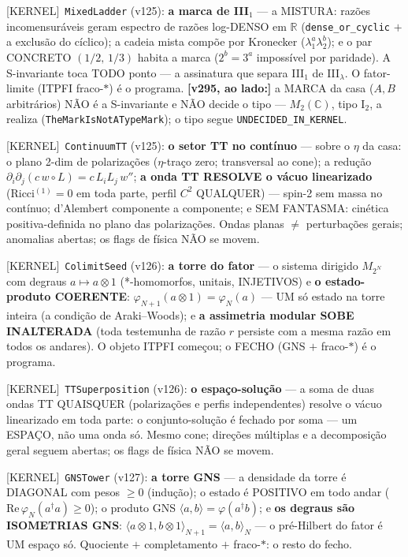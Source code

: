 \documentclass[11pt]{article}
\providecommand{\kernelmk}[1]{\textsf{[KERNEL]}~\texttt{#1}}\providecommand{\knownmk}[1]{\textsf{[KNOWN]}~{#1}}\providecommand{\statusmk}[1]{\textsf{[#1]}}
\theoremstyle{definition}\newtheorem{deriv}{Derivação}
\begin{document}
\kernelmk{MixedLadder} (v125): \textbf{a marca de III$_1$} --- a MISTURA: razões incomensuráveis geram espectro de razões log-DENSO em $\mathbb{R}$ (\texttt{dense\_or\_cyclic} $+$ a exclusão do cíclico); a cadeia mista compõe por Kronecker ($\lambda_1^a\lambda_2^b$); e o par CONCRETO $(1/2,\,1/3)$ habita a marca ($2^b=3^a$ impossível por paridade). A S-invariante toca TODO ponto — a assinatura que separa III$_1$ de III$_\lambda$. O fator-limite (ITPFI fraco-$*$) é o programa. \textbf{[v295, ao lado:]} a MARCA da casa ($A,B$ arbitrários) NÃO é a S-invariante e NÃO decide o tipo — $M_2(\mathbb{C})$, tipo I$_2$, a realiza (\texttt{TheMarkIsNotATypeMark}); o tipo segue \texttt{UNDECIDED\_IN\_KERNEL}.

\kernelmk{ContinuumTT} (v125): \textbf{o setor TT no contínuo} --- sobre o $\eta$ da casa: o plano 2-dim de polarizações ($\eta$-traço zero; transversal ao cone); a redução $\partial_i\partial_j(c\,w{\circ}L)=c\,L_iL_j\,w''$; \textbf{a onda TT RESOLVE o vácuo linearizado} (Ricci$^{(1)}=0$ em toda parte, perfil $C^2$ QUALQUER) --- spin-2 sem massa no contínuo; d'Alembert componente a componente; e SEM FANTASMA: cinética positiva-definida no plano das polarizações. Ondas planas $\neq$ perturbações gerais; anomalias abertas; os flags de física NÃO se movem.

\kernelmk{ColimitSeed} (v126): \textbf{a torre do fator} --- o sistema dirigido $M_{2^N}$ com degraus $a\mapsto a\otimes1$ (*-homomorfos, unitais, INJETIVOS) e \textbf{o estado-produto COERENTE}: $\varphi_{N+1}(a\otimes 1)=\varphi_N(a)$ --- UM só estado na torre inteira (a condição de Araki--Woods); e \textbf{a assimetria modular SOBE INALTERADA} (toda testemunha de razão $r$ persiste com a mesma razão em todos os andares). O objeto ITPFI começou; o FECHO (GNS $+$ fraco-$*$) é o programa.

\kernelmk{TTSuperposition} (v126): \textbf{o espaço-solução} --- a soma de duas ondas TT QUAISQUER (polarizações e perfis independentes) resolve o vácuo linearizado em toda parte: o conjunto-solução é fechado por soma --- um ESPAÇO, não uma onda só. Mesmo cone; direções múltiplas e a decomposição geral seguem abertas; os flags de física NÃO se movem.

\kernelmk{GNSTower} (v127): \textbf{a torre GNS} --- a densidade da torre é DIAGONAL com pesos $\geq 0$ (indução); o estado é POSITIVO em todo andar ($\mathrm{Re}\,\varphi_N(a^\dagger a)\geq 0$); o produto GNS $\langle a,b\rangle=\varphi(a^\dagger b)$; e \textbf{os degraus são ISOMETRIAS GNS}: $\langle a\otimes1,b\otimes1\rangle_{N+1}=\langle a,b\rangle_N$ --- o pré-Hilbert do fator é UM espaço só. Quociente $+$ completamento $+$ fraco-$*$: o resto do fecho.
\end{document}
